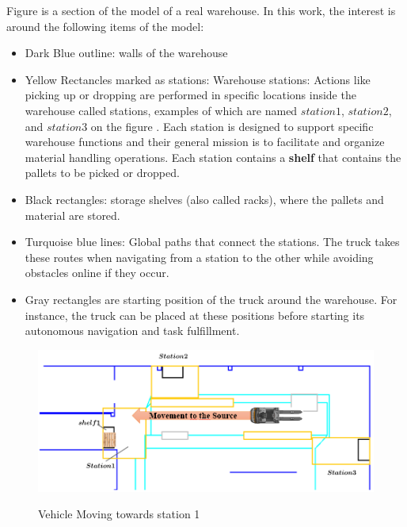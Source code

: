 Figure  is a section of the model of a real warehouse. In this work,
the interest is around the following items of the model:
\begin{itemize}
    \item Dark Blue outline: walls of the warehouse
    \item Yellow Rectancles marked as stations: Warehouse stations: Actions like picking up or 
    dropping are performed in specific locations inside the warehouse called 
    stations, examples of which are named \(station1\), \(station2\), and \(station3\) on the figure .
    Each station is designed to support specific warehouse functions and their general mission
    is to facilitate and organize material handling operations. 
    Each station contains a \textbf{shelf} that contains the pallets to be picked or dropped. 
    \item Black rectangles: storage shelves (also called racks), where the  pallets and material are 
    stored. 
    \item Turquoise blue lines: Global paths that connect the stations.
    The truck takes these routes when navigating from a station to the other while avoiding 
    obstacles online if they occur.
    \item Gray rectangles are starting position of the truck around the warehouse. For instance,
    the truck can be placed at these positions before starting its autonomous navigation and 
    task fulfillment.

\end{itemize}

\begin{figure}[H]
    \begin{center}
       \includegraphics[width=5in]{images/Chap0/move.png}\\
       \caption{Vehicle Moving towards station 1}
       \label{move}
       \end{center}
\end{figure}

